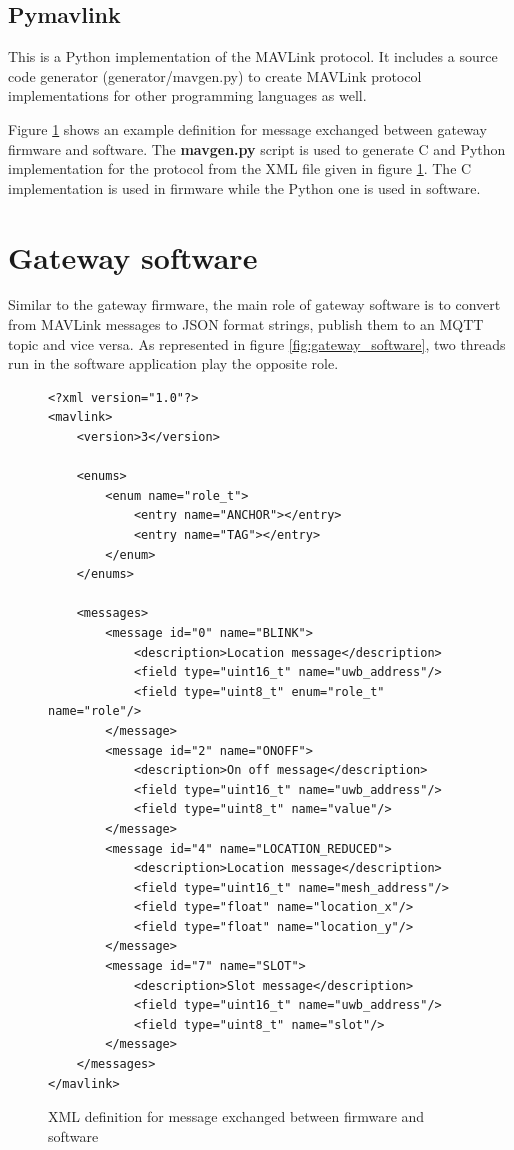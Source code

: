 \documentclass[\main/main.tex]{subfiles}
\begin{document}
\subsection{Pymavlink}

This is a Python implementation of the MAVLink protocol. It includes a source code generator (generator/mavgen.py) to create MAVLink protocol implementations for other programming languages as well. 

Figure \ref{net_mesh_mavlink_protocol} shows an example definition for message exchanged between gateway firmware and software. The \textbf{mavgen.py} script is used to generate C and Python implementation for the protocol from the XML file given in figure \ref{net_mesh_mavlink_protocol}. The C implementation is used in firmware while the Python one is used in software.

\section{Gateway software}
Similar to the gateway firmware, the main role of gateway software is to convert from MAVLink messages to JSON format strings, publish them to an MQTT topic and vice versa. As represented in figure \ref{fig:gateway_software}, two threads run in the software application play the opposite role.


\begin{figure}[H]
    \begin{lstlisting}[style=XMLStyle, emph={messages, message, enums, enum, mavlink}]
<?xml version="1.0"?>
<mavlink>
    <version>3</version>

    <enums>
        <enum name="role_t">
            <entry name="ANCHOR"></entry>
            <entry name="TAG"></entry>
        </enum>
    </enums>

    <messages>
        <message id="0" name="BLINK">
            <description>Location message</description>
            <field type="uint16_t" name="uwb_address"/>
            <field type="uint8_t" enum="role_t" name="role"/>
        </message>
        <message id="2" name="ONOFF">
            <description>On off message</description>
            <field type="uint16_t" name="uwb_address"/>
            <field type="uint8_t" name="value"/>
        </message>
        <message id="4" name="LOCATION_REDUCED">
            <description>Location message</description>
            <field type="uint16_t" name="mesh_address"/>
            <field type="float" name="location_x"/>
            <field type="float" name="location_y"/>
        </message>
        <message id="7" name="SLOT">
            <description>Slot message</description>
            <field type="uint16_t" name="uwb_address"/>
            <field type="uint8_t" name="slot"/>
        </message>
    </messages>
</mavlink>
    \end{lstlisting}
    \caption{XML definition for message exchanged between firmware and software}
    \label{net_mesh_mavlink_protocol}
\end{figure}
\end{document}
